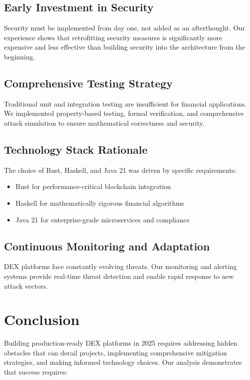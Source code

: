 \documentclass[11pt,a4paper]{article}
\begin{document}
\subsection{Early Investment in Security}

Security must be implemented from day one, not added as an afterthought. Our experience shows that retrofitting security measures is significantly more expensive and less effective than building security into the architecture from the beginning.

\subsection{Comprehensive Testing Strategy}

Traditional unit and integration testing are insufficient for financial applications. We implemented property-based testing, formal verification, and comprehensive attack simulation to ensure mathematical correctness and security.

\subsection{Technology Stack Rationale}

The choice of Rust, Haskell, and Java 21 was driven by specific requirements:
\begin{itemize}
\item Rust for performance-critical blockchain integration
\item Haskell for mathematically rigorous financial algorithms
\item Java 21 for enterprise-grade microservices and compliance
\end{itemize}

\subsection{Continuous Monitoring and Adaptation}

DEX platforms face constantly evolving threats. Our monitoring and alerting systems provide real-time threat detection and enable rapid response to new attack vectors.

\section{Conclusion}

Building production-ready DEX platforms in 2025 requires addressing hidden obstacles that can derail projects, implementing comprehensive mitigation strategies, and making informed technology choices. Our analysis demonstrates that success requires:
\end{document}
